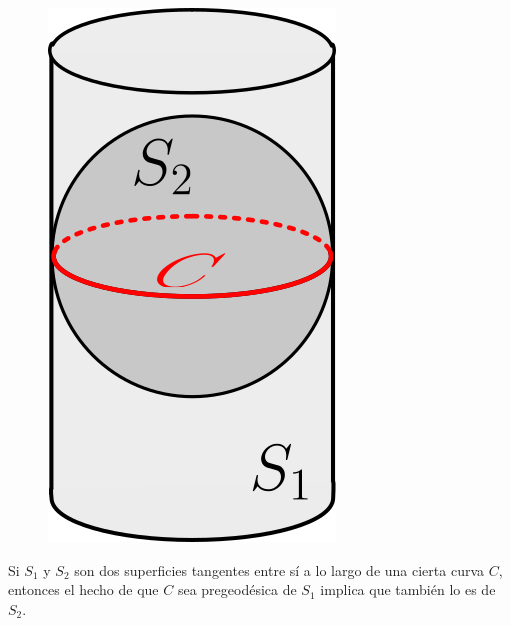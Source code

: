 \begin{figure}
    \centering
    \includegraphics[scale=.35]{FOTOS/cilindro_geo.png}
\end{figure}

Si $S_1$ y $S_2$ son dos superficies tangentes entre sí a lo largo de una cierta curva $C$, entonces el hecho de que $C$ sea pregeodésica de $S_1$ implica que también lo es de $S_2$.
